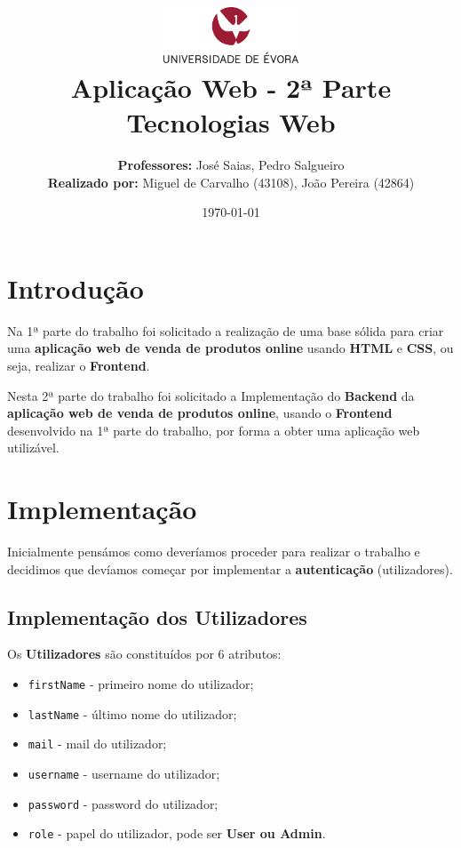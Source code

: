 \documentclass[11pt]{article}   %
\title
{
    \includegraphics[width=0.3\textwidth]{images/logo_universidade.png}
    \\[0.1cm]
    \textbf{Aplicação Web - 2ª Parte} \\
    Tecnologias Web
}
\author
{
    \textbf{Professores:} José Saias, Pedro Salgueiro \\
    \textbf{Realizado por:} Miguel de Carvalho (43108), João Pereira (42864) 
}
\date{\today}
\begin{document}
\maketitle

\section{Introdução} 

\hspace{0,5cm}Na 1ª parte do trabalho foi solicitado a realização de uma base sólida para criar uma 
\textbf{aplicação web de venda de produtos online} usando \textbf{HTML} e \textbf{CSS}, ou seja,
realizar o \textbf{Frontend}. \par

Nesta 2ª parte do trabalho foi solicitado a Implementação do \textbf{Backend} da \textbf{aplicação web de 
venda de produtos online}, usando o \textbf{Frontend} desenvolvido na 1ª parte do trabalho, por forma a 
obter uma aplicação web utilizável.
\section{Implementação}

\hspace{0,5cm}Inicialmente pensámos como deveríamos proceder para realizar o trabalho e decidimos que
devíamos começar por implementar a \textbf{autenticação} (utilizadores).

\subsection{Implementação dos Utilizadores}

Os \textbf{Utilizadores} são constituídos por 6 atributos:
\begin{itemize}
    \item \verb|firstName| - primeiro nome do utilizador;
    \item \verb|lastName| - último nome do utilizador;
    \item \verb|mail| - mail do utilizador;
    \item \verb|username| - username do utilizador;
    \item \verb|password| - password do utilizador;
    \item \verb|role| - papel do utilizador, pode ser \textbf{User ou Admin}.
\end{itemize}
\end{document}
